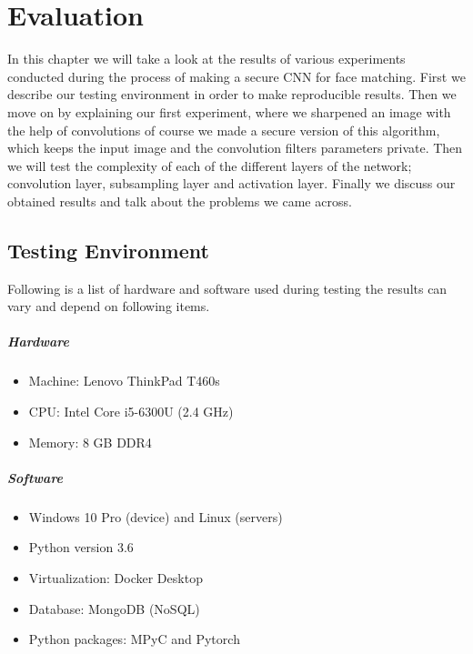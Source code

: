 \chapter{Evaluation}
\label{chapter:evaluation}

In this chapter we will take a look at the results of various experiments conducted during the process of making a secure CNN for face matching. First we describe our testing environment in order to make reproducible results. Then we move on by explaining our first experiment, where we sharpened an image with the help of convolutions of course we made a secure version of this algorithm, which keeps the input image and the convolution filters parameters private. Then we will test the complexity of each of the different layers of the network; convolution layer, subsampling layer and activation layer. Finally we discuss our obtained results and talk about the problems we came across.

\section{Testing Environment}
Following is a list of hardware and software used during testing the results can vary and depend on following items.

\paragraph{Hardware}
\begin{itemize}
  \item Machine: Lenovo ThinkPad T460s
  \item CPU: Intel Core i5-6300U (2.4 GHz)
  \item Memory: 8 GB DDR4
\end{itemize}

\paragraph{Software}
\begin{itemize}
  \item Windows 10 Pro (device) and Linux (servers)
  \item Python version 3.6
  \item Virtualization: Docker Desktop
  \item Database: MongoDB (NoSQL)
  \item Python packages: MPyC and Pytorch
\end{itemize}

